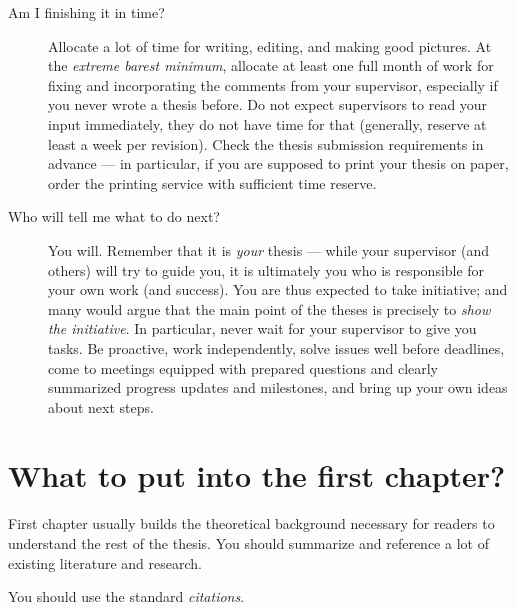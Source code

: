 \begin{description}
\item[Am I finishing it in time?]
Allocate a lot of time for writing, editing, and making good pictures. At the \emph{extreme barest minimum}, allocate at least one full month of work for fixing and incorporating the comments from your supervisor, especially if you never wrote a thesis before. Do not expect supervisors to read your input immediately, they do not have time for that (generally, reserve at least a week per revision). Check the thesis submission requirements in advance --- in particular, if you are supposed to print your thesis on paper, order the printing service with sufficient time reserve.
\item[Who will tell me what to do next?]
You will. Remember that it is \emph{your} thesis --- while your supervisor (and others) will try to guide you, it is ultimately you who is responsible for your own work (and success). You are thus expected to take initiative; and many would argue that the main point of the theses is precisely to \emph{show the initiative}. In particular, never wait for your supervisor to give you tasks. Be proactive, work independently, solve issues well before deadlines, come to meetings equipped with prepared questions and clearly summarized progress updates and milestones, and bring up your own ideas about next steps.
\end{description}

\section{What to put into the first chapter?}

First chapter usually builds the theoretical background necessary for readers to understand the rest of the thesis. You should summarize and reference a lot of existing literature and research.

You should use the standard \emph{citations}.

